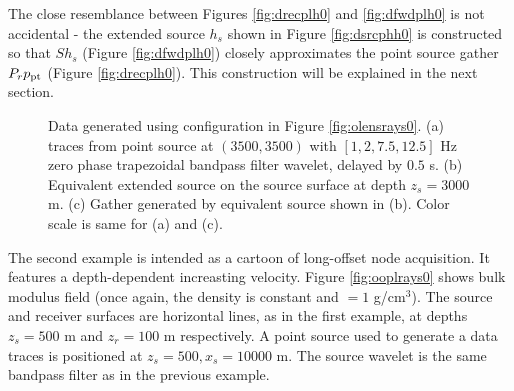 \documentclass[georeport,12pt]{geophysics}
\begin{document}
 The close resemblance between Figures
\ref{fig:drecplh0} and \ref{fig:dfwdplh0} is not accidental  - the
extended source $h_ s$ shown in Figure \ref{fig:dsrcphh0} is constructed
so that $Sh_s$ (Figure \ref{fig:dfwdplh0}) closely
approximates the point source gather $P_r p_{\rm pt}$ (Figure
\ref{fig:drecplh0}). This construction will be explained in the next section.

\begin{figure}
  \centering
  \caption{Data generated using configuration in Figure
    \ref{fig:olensrays0}. (a) traces from point source at $(3500,3500)$
    with $[1, 2, 7.5, 12.5]$ Hz zero phase trapezoidal bandpass
    filter wavelet, delayed by $0.5$ s. (b) Equivalent extended source on
    the source surface at depth $z_s=3000$ m. (c) Gather generated by
    equivalent source shown in (b). Color scale is same for (a) and (c).}
\end{figure}

The second example is intended as a cartoon of long-offset node
acquisition. It features a depth-dependent increasting
velocity. Figure \ref{fig:ooplrays0} shows bulk modulus field (once again, the
density is constant and $= 1$ g/cm$^3$). The source and receiver
surfaces are horizontal lines, as in the first example, at depths
$z_s=500$ m and $z_r= 100$ m respectively. A point source used to
generate a data traces is positioned at $z_s=500, x_s=10000$ m. The
source wavelet is the same bandpass filter as in
the previous example.
\end{document}
